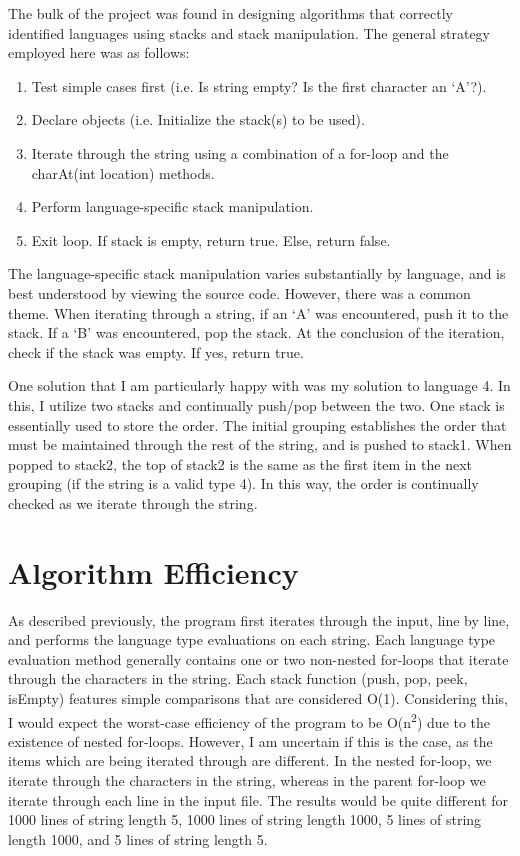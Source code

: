 \documentclass[12pt, titlepage]{article}
\begin{document}
The bulk of the project was found in designing algorithms that correctly identified languages using stacks and stack manipulation. The general strategy employed here was as follows:
\begin{enumerate}
	\item Test simple cases first (i.e. Is string empty? Is the first character an `A'?).
	\item Declare objects (i.e. Initialize the stack(s) to be used).
	\item Iterate through the string using a combination of a for-loop and the charAt(int location) methods.
	\item Perform language-specific stack manipulation.
	\item Exit loop. If stack is empty, return true. Else, return false.
\end{enumerate}
The language-specific stack manipulation varies substantially by language, and is best understood by viewing the source code. However, there was a common theme. When iterating through a string, if an `A' was encountered, push it to the stack. If a `B' was encountered, pop the stack. At the conclusion of the iteration, check if the stack was empty. If yes, return true.

One solution that I am particularly happy with was my solution to language 4. In this, I utilize two stacks and continually push/pop between the two. One stack is essentially used to store the order. The initial grouping establishes the order that must be maintained through the rest of the string, and is pushed to stack1. When popped to stack2, the top of stack2 is the same as the first item in the next grouping (if the string is a valid type 4). In this way, the order is continually checked as we iterate through the string.

\section{Algorithm Efficiency}

As described previously, the program first iterates through the input, line by line, and performs the language type evaluations on each string. Each language type evaluation method generally contains one or two non-nested for-loops that iterate through the characters in the string. Each stack function (push, pop, peek, isEmpty) features simple comparisons that are considered O(1). Considering this, I would expect the worst-case efficiency of the program to be O(n\textsuperscript{2}) due to the existence of nested for-loops. However, I am uncertain if this is the case, as the items which are being iterated through are different. In the nested for-loop, we iterate through the characters in the string, whereas in the parent for-loop we iterate through each line in the input file. The results would be quite different for 1000 lines of string length 5, 1000 lines of string length 1000, 5 lines of string length 1000, and 5 lines of string length 5.
\end{document}
